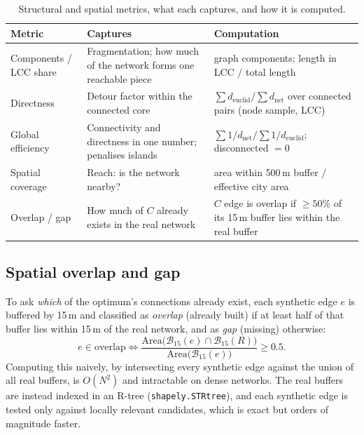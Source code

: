 \documentclass[11pt,a4paper]{article}
\begin{document}
\begin{table}[t]
\centering
\caption{Structural and spatial metrics, what each captures, and how it is computed.}
\label{tab:metrics}
\small
\begin{tabular}{p{2.7cm}p{6.0cm}p{5.6cm}}
\toprule
Metric & Captures & Computation \\
\midrule
Components / LCC share & Fragmentation; how much of the network forms one reachable piece &
graph components; length in LCC \(/\) total length \\
Directness & Detour factor within the connected core &
\(\sum d_{\mathrm{euclid}} \big/ \sum d_{\mathrm{net}}\) over connected pairs (node sample, LCC) \\
Global efficiency & Connectivity and directness in one number; penalises islands &
\(\sum 1/d_{\mathrm{net}} \big/ \sum 1/d_{\mathrm{euclid}}\); disconnected \(=0\) \\
Spatial coverage & Reach: is the network nearby? &
area within 500\,m buffer \(/\) effective city area \\
Overlap / gap & How much of \(C\) already exists in the real network &
\(C\) edge is overlap if \(\ge 50\%\) of its 15\,m buffer lies within the real buffer \\
\bottomrule
\end{tabular}
\end{table}

\subsection{Spatial overlap and gap}

To ask \emph{which} of the optimum's connections already exist, each synthetic edge \(e\)
is buffered by 15\,m and classified as \emph{overlap} (already built) if at least half of
that buffer lies within 15\,m of the real network, and as \emph{gap} (missing) otherwise:
\begin{equation}
e \in \text{overlap} \iff
\frac{\mathrm{Area}\!\big(\mathcal{B}_{15}(e)\cap\mathcal{B}_{15}(R)\big)}
{\mathrm{Area}\!\big(\mathcal{B}_{15}(e)\big)} \ge 0.5 .
\end{equation}
Computing this naively, by intersecting every synthetic edge against the union of all real
buffers, is \(O(N^2)\) and intractable on dense networks. The real buffers are instead
indexed in an R-tree (\texttt{shapely.STRtree}), and each synthetic edge is tested only
against locally relevant candidates, which is exact but orders of magnitude faster.
\end{document}
